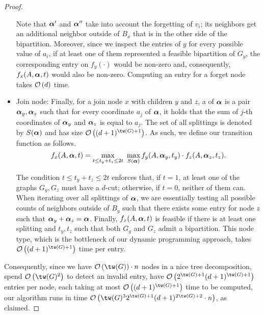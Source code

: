 \begin{proof}
\begin{itemize}
        Note that $\boldsymbol{\alpha}'$ and $\boldsymbol{\alpha}''$ take into account the forgetting of $v_i$; its neighbors get an additional neighbor outside of $B_x$ that is in the other side of the bipartition.
        Moreover, since we inspect the entries of $y$ for every possible value of $a_i$, if at least one of them represented a feasible bipartition of $G_y$, the corresponding entry on $f_y(\cdot)$ would be non-zero and, consequently, $f_x(A, \boldsymbol{\alpha}, t)$ would also be non-zero.
        Computing an entry for a forget node takes $\mathcal{O}\left(d\right)$ time.

        \item Join node: Finally, for a join node $x$ with children $y$ and $z$, a  of $\boldsymbol{\alpha}$ is a pair $\boldsymbol{\alpha}_y, \boldsymbol{\alpha}_z$ such that for every coordinate $a_j$ of $\boldsymbol{\alpha}$, it holds that the sum of $j$-th coordinates of $\boldsymbol{\alpha}_y$ and $\boldsymbol{\alpha}_z$ is equal to $a_j$. The set of all splittings is denoted by $S(\boldsymbol{\alpha})$ and has size $\bigO{(d+1)^{\tw(G)+1}}$.
        As such, we define our transition function as follows.
        \begin{equation*}
            f_x(A, \boldsymbol{\alpha}, t) = \max_{t \leq t_y + t_z \leq 2t}\ \max_{S(\boldsymbol{\alpha})} f_y(A, \boldsymbol{\alpha}_y, t_y) \cdot f_z(A, \boldsymbol{\alpha}_z, t_z).
        \end{equation*}

        The condition $t \leq t_y + t_z \leq 2t$ enforces that, if $t = 1$, at least one of the graphs $G_y, G_z$ must have a $d$-cut; otherwise, if $t = 0$, neither of them can.
        When iterating over all splittings of $\boldsymbol{\alpha}$, we are essentially testing all possible counts of neighbors outside of $B_y$ such that there exists some entry for node $z$ such that $\boldsymbol{\alpha}_y + \boldsymbol{\alpha}_z = \boldsymbol{\alpha}$.
        Finally, $f_x(A, \boldsymbol{\alpha}, t)$ is feasible if there is at least one splitting and $t_y, t_z$ such that both $G_y$ and $G_z$ admit a bipartition.
        This node type, which is the bottleneck of our dynamic programming approach, takes $\bigO{(d+1)^{\tw(G)+1}}$ time per entry.
    \end{itemize}

    Consequently, since we have $\bigO{\tw(G)} \cdot n$ nodes in a nice tree decomposition, spend $\bigO{\tw(G)^2}$ to detect an invalid entry, have $\bigO{2^{\tw(G) +1}(d+1)^{\tw(G)+1}}$ entries per node, each taking at most $\bigO{(d+1)^{\tw(G)+1}}$ time to be computed, our algorithm runs in time $\bigO{\tw(G)^32^{\tw(G)+1}(d+1)^{2\tw(G)+2}\cdot n}$, as claimed.
\end{proof}


